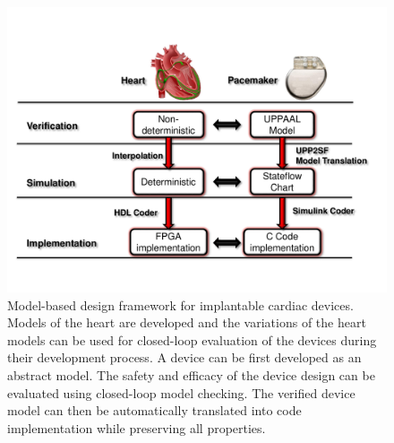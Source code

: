 \documentclass[a4paper,11pt]{article}
\begin{document}



\begin{figure}[t]
	\centering
	\includegraphics[scale=0.45]{figs/model_based_b.pdf}
	\caption{\small Model-based design framework for implantable cardiac devices. Models of the heart are developed and the variations of the heart models can be used for closed-loop evaluation of the devices during their development process. A device can be first developed as an abstract model. The safety and efficacy of the device design can be evaluated using closed-loop model checking. The verified device model can then be automatically translated into code implementation while preserving all properties.}
	\label{fig:MBD}
\end{figure}
\end{document}
